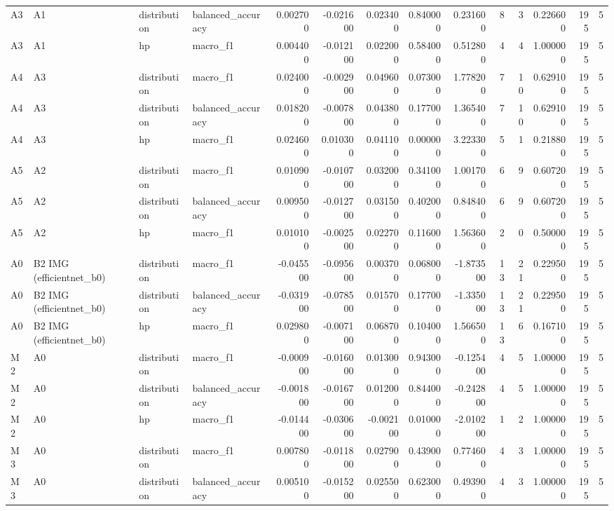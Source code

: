\begin{table}
\begin{tabular}{llllrrrrrrrrrr}
A3 & A1 & distribution & balanced\_accuracy & 0.002700 & -0.021600 & 0.023400 & 0.840000 & 0.231600 & 8 & 3 & 0.226600 & 195 & 5 \\
A3 & A1 & hp & macro\_f1 & 0.004400 & -0.012100 & 0.022000 & 0.584000 & 0.512800 & 4 & 4 & 1.000000 & 195 & 5 \\
A4 & A3 & distribution & macro\_f1 & 0.024000 & -0.002900 & 0.049600 & 0.073000 & 1.778200 & 7 & 10 & 0.629100 & 195 & 5 \\
A4 & A3 & distribution & balanced\_accuracy & 0.018200 & -0.007800 & 0.043800 & 0.177000 & 1.365400 & 7 & 10 & 0.629100 & 195 & 5 \\
A4 & A3 & hp & macro\_f1 & 0.024600 & 0.010300 & 0.041100 & 0.000000 & 3.223300 & 5 & 1 & 0.218800 & 195 & 5 \\
A5 & A2 & distribution & macro\_f1 & 0.010900 & -0.010700 & 0.032000 & 0.341000 & 1.001700 & 6 & 9 & 0.607200 & 195 & 5 \\
A5 & A2 & distribution & balanced\_accuracy & 0.009500 & -0.012700 & 0.031500 & 0.402000 & 0.848400 & 6 & 9 & 0.607200 & 195 & 5 \\
A5 & A2 & hp & macro\_f1 & 0.010100 & -0.002500 & 0.022700 & 0.116000 & 1.563600 & 2 & 0 & 0.500000 & 195 & 5 \\
A0 & B2 IMG (efficientnet\_b0) & distribution & macro\_f1 & -0.045500 & -0.095600 & 0.003700 & 0.068000 & -1.873500 & 13 & 21 & 0.229500 & 195 & 5 \\
A0 & B2 IMG (efficientnet\_b0) & distribution & balanced\_accuracy & -0.031900 & -0.078500 & 0.015700 & 0.177000 & -1.335000 & 13 & 21 & 0.229500 & 195 & 5 \\
A0 & B2 IMG (efficientnet\_b0) & hp & macro\_f1 & 0.029800 & -0.007100 & 0.068700 & 0.104000 & 1.566500 & 13 & 6 & 0.167100 & 195 & 5 \\
M2 & A0 & distribution & macro\_f1 & -0.000900 & -0.016000 & 0.013000 & 0.943000 & -0.125400 & 4 & 5 & 1.000000 & 195 & 5 \\
M2 & A0 & distribution & balanced\_accuracy & -0.001800 & -0.016700 & 0.012000 & 0.844000 & -0.242800 & 4 & 5 & 1.000000 & 195 & 5 \\
M2 & A0 & hp & macro\_f1 & -0.014400 & -0.030600 & -0.002100 & 0.010000 & -2.010200 & 1 & 2 & 1.000000 & 195 & 5 \\
M3 & A0 & distribution & macro\_f1 & 0.007800 & -0.011800 & 0.027900 & 0.439000 & 0.774600 & 4 & 3 & 1.000000 & 195 & 5 \\
M3 & A0 & distribution & balanced\_accuracy & 0.005100 & -0.015200 & 0.025500 & 0.623000 & 0.493900 & 4 & 3 & 1.000000 & 195 & 5 \\

\end{tabular}
\end{table}
